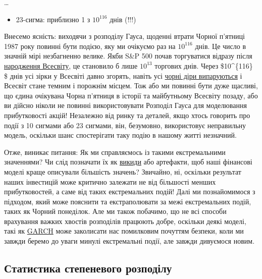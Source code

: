 \documentclass[
  letterpaper,
]{report}
\providecommand{\tightlist}{%
  \setlength{\itemsep}{0pt}\setlength{\parskip}{0pt}}\usepackage{longtable,booktabs,array}
\begin{document}
\ldots{}

\begin{itemize}
\tightlist
\item
  23-сигма: приблизно 1 з \(10^{116}\) днів (!!!)
\end{itemize}

Внесемо ясність: виходячи з розподілу Гауса, щоденні втрати Чорної
п'ятниці 1987 року повинні бути подією, яку ми очікуємо раз на
\(10^{116}\) днів. Це число в значній мірі незбагненно велике. Якби S\&P
500 почав торгуватися відразу після
\href{https://en.wikipedia.org/wiki/Age_of_the_universe}{народження
Всесвіту}, це становило б лише \(10^{13}\) торгових днів. Через
\$10\^{}\{116\} \$ днів усі зірки у Всесвіті давно згорять, навіть усі
\href{https://en.wikipedia.org/wiki/Future_of_an_expanding_universe\#Dark_Era_and_Photon_Age}{чорні
діри випаруються} і Всесвіт стане темним і порожнім місцем. Тож або ми
повинні бути дуже щасливі, що єдина очікувана Чорна п'ятниця в історії
та майбутньому Всесвіту позаду, або ви дійсно ніколи не повинні
використовувати Розподіл Гауса для моделювання прибутковості акцій!
Незалежно від ринку та деталей, якщо хтось говорить про події з 10
сигмами або 23 сигмами, він, безумовно, використовує неправильну модель,
оскільки шанс спостерігати таку подію в нашому житті незначний.

Отже, виникає питання: Як ми справляємось із такими екстремальними
значеннями? Чи слід позначати їх як
\href{https://en.wikipedia.org/wiki/Outlier}{викиди} або артефакти, щоб
наші фінансові моделі краще описували більшість значень? Звичайно, ні,
оскільки результат наших інвестицій може критично залежати не від
більшості менших прибутковостей, а саме від таких екстремальних подій!
Далі ми познайомимося з підходом, який може пояснити та екстраполювати
за межі екстремальних подій, таких як Чорний понеділок. Але ми також
побачимо, що не всі способи врахування важких хвостів розподілів
працюють добре, оскільки деякі моделі, такі як
\href{https://en.wikipedia.org/wiki/Autoregressive_conditional_heteroskedasticity}{GARCH}
може заколисати нас помилковим почуттям безпеки, коли ми завжди беремо
до уваги минулі екстремальні події, але завжди дивуємося новим.

\hypertarget{ux441ux442ux430ux442ux438ux441ux442ux438ux43aux430-ux441ux442ux435ux43fux435ux43dux435ux432ux43eux433ux43e-ux440ux43eux437ux43fux43eux434ux456ux43bux443}{%
\subsection{Статистика степеневого
розподілу}\label{ux441ux442ux430ux442ux438ux441ux442ux438ux43aux430-ux441ux442ux435ux43fux435ux43dux435ux432ux43eux433ux43e-ux440ux43eux437ux43fux43eux434ux456ux43bux443}}
\end{document}
